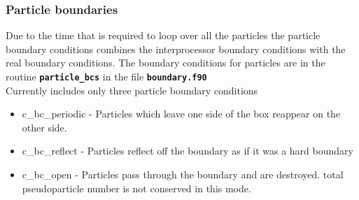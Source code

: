 \documentclass[12pt,a4paper]{article}
\newcommand{\inlinecode}[1]{{\color{warwickred} \bf\texttt{#1}}}
\newcommand{\EPOCH}{{\color{warwickdark}\fontfamily{phv}\selectfont{EPOCH}}}
\begin{document}
\subsubsection{Particle boundaries}
Due to the time that is required to loop over all the particles the particle
boundary conditions {\EPOCH} combines the interprocessor boundary conditions with
the real boundary conditions. The boundary conditions for particles are in the
routine \inlinecode{particle\_bcs} in the file \inlinecode{boundary.f90} \\
Currently {\EPOCH} includes only three particle boundary conditions
\begin{itemize}
\item c\_bc\_periodic - Particles which leave one side of the box reappear on the
  other side.
\item c\_bc\_reflect - Particles reflect off the boundary as if it was a hard
  boundary
\item c\_bc\_open - Particles pass through the boundary and are destroyed. total
  pseudoparticle number is not conserved in this mode.
\end{itemize}
\end{document}
